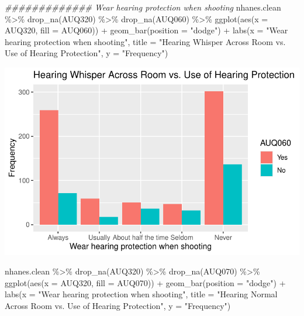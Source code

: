 \documentclass[
  letterpaper,
  DIV=11,
  numbers=noendperiod]{scrreprt}
\newenvironment{Shaded}{\begin{snugshade}}{\end{snugshade}}
\newcommand{\AttributeTok}[1]{\textcolor[rgb]{0.40,0.45,0.13}{#1}}
\newcommand{\DocumentationTok}[1]{\textcolor[rgb]{0.37,0.37,0.37}{\textit{#1}}}
\newcommand{\FunctionTok}[1]{\textcolor[rgb]{0.28,0.35,0.67}{#1}}
\newcommand{\NormalTok}[1]{\textcolor[rgb]{0.00,0.23,0.31}{#1}}
\newcommand{\SpecialCharTok}[1]{\textcolor[rgb]{0.37,0.37,0.37}{#1}}
\newcommand{\StringTok}[1]{\textcolor[rgb]{0.13,0.47,0.30}{#1}}
\begin{document}
\begin{Shaded}
\begin{Highlighting}[]
\DocumentationTok{\#\#\#\#\#\#\#\#\#\#\#\#\# Wear hearing protection when shooting}
\NormalTok{nhanes.clean }\SpecialCharTok{\%\textgreater{}\%}
    \FunctionTok{drop\_na}\NormalTok{(AUQ320) }\SpecialCharTok{\%\textgreater{}\%}
    \FunctionTok{drop\_na}\NormalTok{(AUQ060) }\SpecialCharTok{\%\textgreater{}\%}
    \FunctionTok{ggplot}\NormalTok{(}\FunctionTok{aes}\NormalTok{(}\AttributeTok{x =}\NormalTok{ AUQ320, }\AttributeTok{fill =}\NormalTok{ AUQ060)) }\SpecialCharTok{+} \FunctionTok{geom\_bar}\NormalTok{(}\AttributeTok{position =} \StringTok{"dodge"}\NormalTok{) }\SpecialCharTok{+}
    \FunctionTok{labs}\NormalTok{(}\AttributeTok{x =} \StringTok{"Wear hearing protection when shooting"}\NormalTok{, }\AttributeTok{title =} \StringTok{"Hearing Whisper Across Room vs. Use of Hearing Protection"}\NormalTok{,}
        \AttributeTok{y =} \StringTok{"Frequency"}\NormalTok{)}
\end{Highlighting}
\end{Shaded}

\includegraphics{dataviz_files/figure-pdf/unnamed-chunk-59-4.pdf}

\begin{Shaded}
\begin{Highlighting}[]
\NormalTok{nhanes.clean }\SpecialCharTok{\%\textgreater{}\%}
    \FunctionTok{drop\_na}\NormalTok{(AUQ320) }\SpecialCharTok{\%\textgreater{}\%}
    \FunctionTok{drop\_na}\NormalTok{(AUQ070) }\SpecialCharTok{\%\textgreater{}\%}
    \FunctionTok{ggplot}\NormalTok{(}\FunctionTok{aes}\NormalTok{(}\AttributeTok{x =}\NormalTok{ AUQ320, }\AttributeTok{fill =}\NormalTok{ AUQ070)) }\SpecialCharTok{+} \FunctionTok{geom\_bar}\NormalTok{(}\AttributeTok{position =} \StringTok{"dodge"}\NormalTok{) }\SpecialCharTok{+}
    \FunctionTok{labs}\NormalTok{(}\AttributeTok{x =} \StringTok{"Wear hearing protection when shooting"}\NormalTok{, }\AttributeTok{title =} \StringTok{"Hearing Normal Across Room vs. Use of Hearing Protection"}\NormalTok{,}
        \AttributeTok{y =} \StringTok{"Frequency"}\NormalTok{)}
\end{Highlighting}
\end{Shaded}
\end{document}
